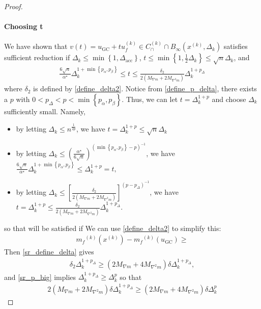 \documentclass{article}
\theoremstyle{case}
\numberwithin{theorem}{subsection}
\newcommand{\capcones}{{C^{(k)}_{\cap}}}
\newcommand{\dacc}{{\Delta_{\textrm{acc}}}}
\newcommand{\dk}{\Delta_k}
\newcommand{\maxmodelhessian}{{M_{\nabla^2 m}}}
\newcommand{\mfk}{{{m}_f}^{(k)}}
\newcommand{\minanglealpha}{{ \alpha^{\star} }}
\newcommand{\tr}{{ B_{\infty}\left(\xk, \dk\right) }}
\newcommand{\xk}{x^{(k)}}
\newcommand{\maxmodelgrad}{{M_{\nabla m}}}
\newcommand{\minangledirk}{{u^{(k)}_f}}
\begin{document}
\begin{proof}
\paragraph{Choosing t}

We have shown that $v(t) = u_{\textrm{GC}} + t \minangledirk \in \capcones \cap \tr$ satisfies sufficient reduction 
if $\dk \le \min\left\{1, \dacc\right\}$, $t \le \min\left\{1, \frac 1 2 \dk\right\} \le \sqrt{n} \dk$, and
\begin{align*}
\frac{6 \sqrt{n}}{\minanglealpha} \dk^{1 + \min\left\{p_{\alpha}, p_{\beta}\right\}} \le t 
\le \frac {\delta_2}{2\left(\maxmodelgrad + 2\maxmodelhessian\right)} \dk^{1 + p_{\Delta}}
\end{align*}
where $\delta_2$ is defined by \cref{define_delta2}.
Notice from \cref{define_p_delta}, there exists a $p$ with $0 < p_{\Delta} < p < \min\left\{p_{\alpha}, p_{\beta}\right\}$.
Thus, we can let $t = \dk^{1+p}$ and choose $\dk$ sufficiently small.
Namely,
\begin{itemize}
\item by letting 
$\dk \le n^{\frac 1 {2p} }$, we have
$t = \dk^{1+p} \le \sqrt{n} \dk$
\item by letting 
$\dk \le \left(\frac{\minanglealpha}{6 \sqrt{n}}\right)^{\left(\min\left\{p_{\alpha}, p_{\beta}\right\} - p\right)^{-1}}$, we have
$\frac{6 \sqrt{n}}{\minanglealpha} \dk^{1 + \min\left\{p_{\alpha}, p_{\beta}\right\}} \le \dk^{1+p} = t,$
\item by letting 
$\dk \le \left[ \frac {\delta_2}{2\left(\maxmodelgrad + 2\maxmodelhessian\right)} \right]^{\left(p - p_{\Delta}\right)^{-1}}$, we have
$t = \dk^{1+p} \le  \frac {\delta_2}{2\left(\maxmodelgrad + 2\maxmodelhessian\right)} \dk^{1 + p_{\Delta}}$.
\end{itemize}




\color{red}
so that  will be satisfied if
We can use \cref{define_delta2} to simplify this:
\begin{align*}
\mfk(\xk) - \mfk(u_{\textrm{GC}}) \ge 
\end{align*}
Then \cref{sr_define_delta} gives
\begin{align*}
\delta_2 \dk^{1 + p_{\Delta}} \ge \left(2\maxmodelgrad + 4\maxmodelhessian\right)\delta\dk^{1 + p_{\Delta}},
\end{align*}
and \cref{sr_p_big} implies $\dk^{1+p_{\Delta}} \ge \dk^p$ so that
\begin{align*}
2\left(\maxmodelgrad + 2\maxmodelhessian\right)\delta\dk^{1 + p_{\Delta}}
\ge \left(2\maxmodelgrad + 4\maxmodelhessian\right)\delta\dk^{p}
\end{align*}


\end{proof}
\end{document}
